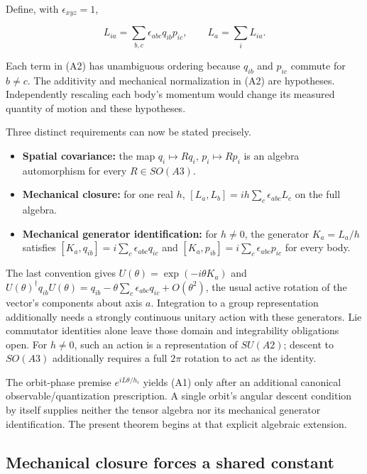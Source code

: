 \documentclass[11pt,a4paper]{article}
\newcommand{\tightlist}{\setlength{\itemsep}{0pt}\setlength{\parskip}{0pt}}
\begin{document}
Define, with \(\epsilon_{xyz}=1\),

\[
L_{ia}=\sum_{b,c}\epsilon_{abc}q_{ib}p_{ic},\qquad
L_a=\sum_iL_{ia}. \tag{A2}
\]

Each term in (A2) has unambiguous ordering because \(q_{ib}\) and
\(p_{ic}\) commute for \(b\ne c\). The additivity and mechanical
normalization in (A2) are hypotheses. Independently rescaling each
body's momentum would change its measured quantity of motion and these
hypotheses.

Three distinct requirements can now be stated precisely.

\begin{itemize}
\tightlist
\item
  \textbf{Spatial covariance:} the map \(q_i\mapsto Rq_i\),
  \(p_i\mapsto Rp_i\) is an algebra automorphism for every
  \(R\in SO(A3)\).
\item
  \textbf{Mechanical closure:} for one real \(h\),
  \([L_a,L_b]=ih\sum_c\epsilon_{abc}L_c\) on the full algebra.
\item
  \textbf{Mechanical generator identification:} for \(h\ne0\), the
  generator \(K_a=L_a/h\) satisfies
  \([K_a,q_{ib}]=i\sum_c\epsilon_{abc}q_{ic}\) and
  \([K_a,p_{ib}]=i\sum_c\epsilon_{abc}p_{ic}\) for every body.
\end{itemize}

The last convention gives \(U(\theta)=\exp(-i\theta K_a)\) and
\(U(\theta)^\dagger q_{ib}U(\theta) =q_{ib}-\theta\sum_c\epsilon_{abc}q_{ic}+O(\theta^2)\),
the usual active rotation of the vector's components about axis \(a\).
Integration to a group representation additionally needs a strongly
continuous unitary action with these generators. Lie commutator
identities alone leave those domain and integrability obligations open.
For \(h\ne0\), such an action is a representation of \(SU(A2)\); descent
to \(SO(A3)\) additionally requires a full \(2\pi\) rotation to act as
the identity.

The orbit-phase premise \(e^{iL\theta/h_i}\) yields (A1) only after an
additional canonical observable/quantization prescription. A single
orbit's angular descent condition by itself supplies neither the tensor
algebra nor its mechanical generator identification. The present theorem
begins at that explicit algebraic extension.

\hypertarget{mechanical-closure-forces-a-shared-constant}{%
\subsection{Mechanical closure forces a shared
constant}\label{mechanical-closure-forces-a-shared-constant}}
\end{document}

